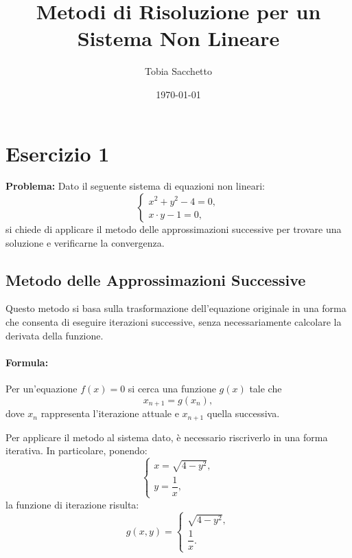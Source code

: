 \documentclass[11pt]{article}
\begin{document}
\title{Metodi di Risoluzione per un Sistema Non Lineare}

\author{Tobia Sacchetto}
\date{\today}
\maketitle

\section*{Esercizio 1}

\textbf{Problema:} Dato il seguente sistema di equazioni non lineari:
\[
\begin{cases}
  x^2 + y^2 - 4 = 0, \\
  x \cdot y - 1 = 0,
\end{cases}
\]
si chiede di applicare il metodo delle approssimazioni successive per trovare una soluzione e verificarne la convergenza.

\subsection*{Metodo delle Approssimazioni Successive}
Questo metodo si basa sulla trasformazione dell’equazione originale in una forma che consenta di eseguire iterazioni successive, senza necessariamente calcolare la derivata della funzione.

\paragraph{Formula:}  
Per un’equazione \( f(x)=0 \) si cerca una funzione \( g(x) \) tale che
\[
	x_{n+1}=g(x_n),
\]
dove \( x_n \) rappresenta l’iterazione attuale e \( x_{n+1} \) quella successiva.

Per applicare il metodo al sistema dato, è necessario riscriverlo in una forma iterativa. In particolare, ponendo:
\[
\begin{cases}
  x = \sqrt{4-y^2}, \\[1mm]
  y = \dfrac{1}{x},
\end{cases}
\]
la funzione di iterazione risulta:
\[
  g(x,y) = \begin{cases}
    \sqrt{4-y^2}, \\
    \dfrac{1}{x}.
  \end{cases}
\]
\end{document}
